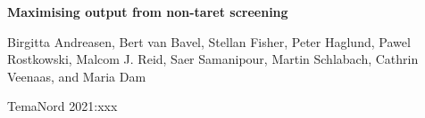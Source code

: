 \begin{titlepage}

\vspace*{7cm}

{\Huge\bfseries Maximising output from non-taret screening\par}

\vspace{1.5cm}
  
{\normalsize Birgitta Andreasen, Bert van Bavel, Stellan Fisher, Peter Haglund, Pawel Rostkowski, Malcom J. Reid, Saer Samanipour, Martin Schlabach, Cathrin Veenaas, and Maria Dam\par}

\vfill

{\large TemaNord 2021:xxx\par}

\vspace*{2cm}

\end{titlepage}
